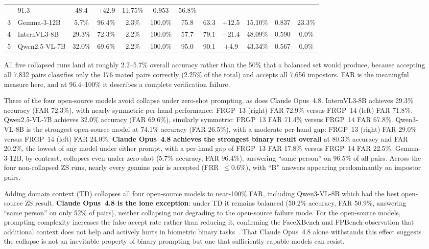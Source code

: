\documentclass[journal]{IEEEtran}
\begin{document}
\begin{table}[t]
\begin{tabular}{c l cccc cccccc}
  & 91.3 & 48.4 & $+$42.9 & 11.75\%
  & \cellcolor{aucStrong}0.953 & 56.8\% \\
3 & Gemma-3-12B
  & 5.7\% & \cellcolor{collapseRed}96.4\% & 2.3\% & \cellcolor{collapseRed}100.0\%
  & 75.8 & 63.3 & $+$12.5 & 15.10\%
  & \cellcolor{aucMid}0.837 & 23.3\% \\
4 & InternVL3-8B
  & 29.3\% & 72.3\% & 2.2\% & \cellcolor{collapseRed}100.0\%
  & 57.7 & 79.1 & $-$21.4 & 48.09\%
  & \cellcolor{aucWeak}0.590 & 0.0\% \\
5 & Qwen2.5-VL-7B
  & 32.0\% & 69.6\% & 2.2\% & \cellcolor{collapseRed}100.0\%
  & 95.0 & 90.1 & $+$4.9 & 43.34\%
  & \cellcolor{aucBad}0.567 & 0.0\% \\
\bottomrule
\end{tabular}
\end{table}

All five collapsed runs land at roughly 2.2--5.7\% overall accuracy rather
than the 50\% that a balanced set would produce, because accepting all
7,832 pairs classifies only the 176 mated pairs correctly (2.25\% of the
total) and accepts all 7,656 impostors.
FAR is the meaningful measure here, and at 96.4--100\% it describes a
complete verification failure.

Three of the four open-source models avoid collapse under zero-shot
prompting, as does Claude Opus~4.8.
InternVL3-8B achieves 29.3\% accuracy (FAR 72.3\%), with nearly
symmetric per-hand performance: FRGP~13 (right) FAR 72.9\% versus
FRGP~14 (left) FAR 71.8\%.
Qwen2.5-VL-7B achieves 32.0\% accuracy (FAR 69.6\%), similarly
symmetric: FRGP~13 FAR 71.4\% versus FRGP~14 FAR 67.8\%.
Qwen3-VL-8B is the strongest open-source model at 74.1\% accuracy
(FAR 26.5\%), with a moderate per-hand gap: FRGP~13 (right) FAR 29.0\%
versus FRGP~14 (left) FAR 24.0\%.
\textbf{Claude Opus~4.8 achieves the strongest binary result overall} at
80.3\% accuracy and FAR 20.2\%, the lowest of any model under either
prompt, with a per-hand gap of FRGP~13 FAR 17.8\% versus FRGP~14
FAR 22.5\%.
Gemma-3-12B, by contrast, collapses even under zero-shot (5.7\% accuracy,
FAR 96.4\%), answering ``same person'' on 96.5\% of all pairs.
Across the four non-collapsed ZS runs, nearly every genuine pair is
accepted (FRR~$\leq$0.6\%), with ``B'' answers appearing predominantly on
impostor pairs.

Adding domain context (TD) collapses all four open-source models to
near-100\% FAR, including Qwen3-VL-8B which had the best open-source ZS
result. \textbf{Claude Opus~4.8 is the lone exception}: under TD it remains
balanced (50.2\% accuracy, FAR 50.9\%, answering ``same person'' on only
52\% of pairs), neither collapsing nor degrading to the open-source
failure mode.
For the open-source models, prompting complexity increases the false
accept rate rather than reducing it, confirming the FaceXBench and FPBench
observation that additional context does not help and actively hurts in
biometric binary tasks~\cite{facexbench2024,fpbench2025}.
That Claude Opus~4.8 alone withstands this effect suggests the collapse is
not an inevitable property of binary prompting but one that sufficiently
capable models can resist.
\end{document}
